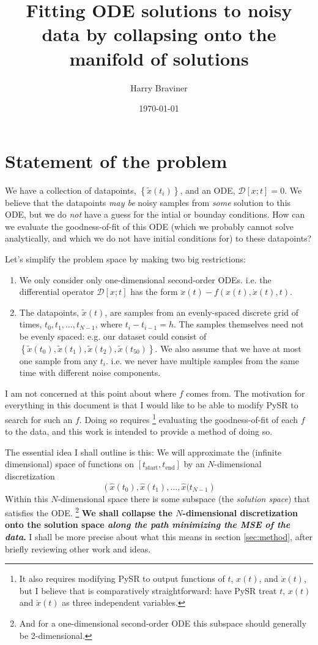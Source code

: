 \documentclass{article}
\title{Fitting ODE solutions to noisy data by collapsing onto the manifold of solutions}
\author{Harry Braviner}
\date{\today}
\begin{document}
\maketitle

\section{Statement of the problem}

We have a collection of datapoints, $\left\{ \tilde{x}(t_i) \right\}$, and an ODE, $\mathcal{D}\left[ x; t \right] = 0$. We believe that the datapoints \emph{may be} noisy samples from \emph{some} solution to this ODE, but we do \emph{not} have a guess for the intial or bounday conditions. How can we evaluate the goodness-of-fit of this ODE (which we probably cannot solve analytically, and which we do not have initial conditions for) to these datapoints?

Let's simplify the problem space by making two big restrictions:
\begin{enumerate}
\item We only consider only one-dimensional second-order ODEs. i.e. the differential operator $\mathcal{D}\left[x ; t \right]$ has the form $\ddot{x}(t) - f\left(x(t), \dot{x}(t), t\right)$.
\item The datapoints, $\tilde{x}(t)$, are samples from an evenly-spaced discrete grid of times, $t_0, t_1, \dots, t_{N-1}$, where $t_i - t_{i-1} = h$. The samples themselves need not be evenly spaced: e.g. our dataset could consist of $\left\{\tilde{x}(t_0), \tilde{x}(t_1), \tilde{x}(t_2), \tilde{x}(t_{50})\right\}$. We also assume that we have at most one sample from any $t_i$. i.e. we never have multiple samples from the same time with different noise components.
\end{enumerate}

I am not concerned at this point about where $f$ comes from.
The motivation for everything in this document is that I would like to be able to modify PySR to search for such an $f$.
Doing so requires%
\footnote{It also requires modifying PySR to output functions of $t$, $x(t)$, and $\dot{x}(t)$, but I believe that is comparatively straightforward: have PySR treat $t$, $x(t)$ and $\dot{x}(t)$ as three independent variables.}
evaluating the goodness-of-fit of each $f$ to the data, and this work is intended to provide a method of doing so.

The essential idea I shall outline is this: We will approximate the (infinite dimensional) space of functions on $\left[t_{\mathrm{start}}, t_{\mathrm{end}} \right]$ by an $N$-dimensional discretization
$$
\left( \hat{x}(t_0), \hat{x}(t_1), \dots, \hat{x}(t_{N-1} \right)
$$
Within this $N$-dimensional space there is some subspace (the \emph{solution space}) that satisfies the ODE.%
\footnote{
And for a one-dimensional second-order ODE this subspace should generally be 2-dimensional.
}
\textbf{We shall collapse the $N$-dimensional discretization onto the solution space \emph{along the path minimizing the MSE of the data}.}
I shall be more precise about what this means in section \ref{sec:method}, after briefly reviewing other work and ideas.
\end{document}
